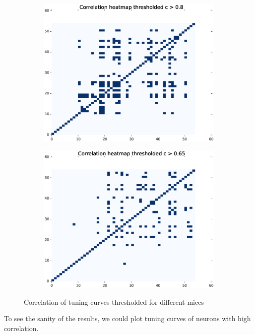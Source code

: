 \documentclass[11pt]{article}
\begin{document}
\begin{figure}
\begin{subfigure}{.48\textwidth}
        \centering
        \includegraphics[width=\linewidth]{plots/tuningCorr_desc_civar_thres_m3}
    \end{subfigure}
    \begin{subfigure}{.48\textwidth}
        \centering
        \includegraphics[width=\linewidth]{plots/tuningCorr_desc_civar_thres_m4}
    \end{subfigure}
    \caption{Correlation of tuning curves thresholded for different mices}
    \label{tuningCorr_thres}
\end{figure}
To see the sanity of the results, we could plot tuning curves of neurons with high correlation.
\end{document}
